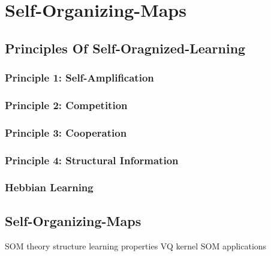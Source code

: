 \section{Self-Organizing-Maps}
\label{sect:self-organizing-maps}


\subsection{Principles Of Self-Oragnized-Learning}
\label{ssect:principles-of-self-organized-learning}


\subsubsection{Principle 1: Self-Amplification}
\label{sssect:principle1-self-amplification}


\subsubsection{Principle 2: Competition}
\label{sssect:principle2:competition}


\subsubsection{Principle 3: Cooperation}
\label{sssect:principle3:cooperation}


\subsubsection{Principle 4: Structural Information}
\label{sssect:principle4:structural-information}


\subsubsection{Hebbian Learning}
\label{sssect:hebbian-learning}


\subsection{Self-Organizing-Maps}
\label{ssect:self-organizing-maps}


SOM
	theory
	structure
	learning
	properties
		VQ
	kernel SOM
	applications